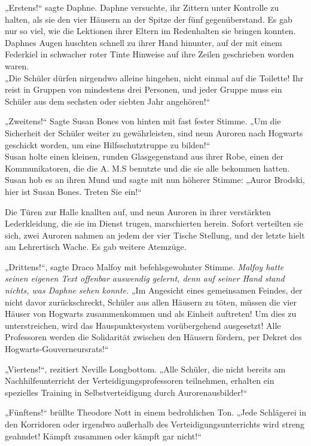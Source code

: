{„Erstens!“ sagte Daphne. Daphne versuchte, ihr Zittern unter Kontrolle zu halten, als sie den vier Häusern an der Spitze der fünf gegenüberstand. Es gab nur so viel, wie die Lektionen ihrer Eltern im Redenhalten sie bringen konnten. Daphnes Augen huschten schnell zu ihrer Hand hinunter, auf der mit einem Federkiel in schwacher roter Tinte Hinweise auf ihre Zeilen geschrieben worden waren.\\ „Die Schüler dürfen nirgendwo alleine hingehen, nicht einmal auf die Toilette! Ihr reist in Gruppen von mindestens drei Personen, und jeder Gruppe muss ein Schüler aus dem sechsten oder siebten Jahr angehören!“

„Zweitens!“ Sagte Susan Bones von hinten mit fast fester Stimme. „Um die Sicherheit der Schüler weiter zu gewährleisten, sind neun Auroren nach Hogwarts geschickt worden, um eine Hilfsschutztruppe zu bilden!“\\ Susan holte einen kleinen, runden Glasgegenstand aus ihrer Robe, einen der Kommunikatoren, die die A. M.S benutzte und die sie alle bekommen hatten. Susan hob es an ihren Mund und sagte mit nun höherer Stimme: „Auror Brodski, hier ist Susan Bones. Treten Sie ein!“

Die Türen zur Halle knallten auf, und neun Auroren in ihrer verstärkten Lederkleidung, die sie im Dienst trugen, marschierten herein. Sofort verteilten sie sich, zwei Auroren nahmen an jedem der vier Tische Stellung, und der letzte hielt am Lehrertisch Wache. Es gab weitere Atemzüge.

„Drittens!“, sagte Draco Malfoy mit befehlsgewohnter Stimme. \emph{Malfoy hatte seinen eigenen Text offenbar auswendig gelernt, denn auf seiner Hand stand nichts, was Daphne sehen konnte.} „Im Angesicht eines gemeinsamen Feindes, der nicht davor zurückschreckt, Schüler aus allen Häusern zu töten, müssen die vier Häuser von Hogwarts zusammenkommen und als Einheit auftreten! Um dies zu unterstreichen, wird das Hauspunktesystem vorübergehend ausgesetzt! Alle Professoren werden die Solidarität zwischen den Häusern fördern, per Dekret des Hogwarts-Gouverneursrats!“

„Viertens!“, rezitiert Neville Longbottom. „Alle Schüler, die nicht bereits am Nachhilfeunterricht der Verteidigungsprofessoren teilnehmen, erhalten ein spezielles Training in Selbstverteidigung durch Aurorenausbilder!“

„Fünftens!“ brüllte Theodore Nott in einem bedrohlichen Ton. „Jede Schlägerei in den Korridoren oder irgendwo außerhalb des Verteidigungsunterrichts wird streng geahndet! Kämpft zusammen oder kämpft gar nicht!“

}

